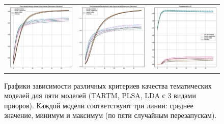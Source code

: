 \begin{figure}
\begin{tabular}{ccc}
    \includegraphics[width=55mm]{images/CH4_vs_regularized_diversity_jensenshannon_False.eps} &   \includegraphics[width=55mm]{images/CH4_vs_regularized_diversity_jensenshannon_True.eps} & \includegraphics[width=55mm]{images/CH4_vs_regularized_SparsityThetaScore.eps} \\ 

\end{tabular} 

    \caption{Графики зависимости различных критериев качества тематических моделей для пяти моделей (TARTM, PLSA, LDA с 3 видами приоров). Каждой модели соответствуют три линии: среднее значение, минимум и максимум (по пяти случайным перезапускам).} 

\label{fig:ch4_vs_reg} 

\end{figure} 

 

 

